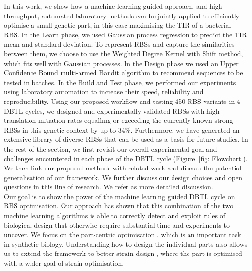 \documentclass{article}
\begin{document}
In this work, we show how a machine learning guided approach, and high-throughput, automated laboratory methods can be jointly applied to efficiently optimise a small genetic part, in this case maximising the TIR of a bacterial RBS.
In the Learn phase, we used Gaussian process regression to predict the TIR mean and standard deviation.
To represent RBSs and capture the similarities between them, we choose to use
the Weighted Degree Kernel with Shift method, which fits well with Gaussian processes.
In the Design phase we used an Upper Confidence Bound multi-armed Bandit algorithm to recommend sequences to be tested in batches.
In the Build and Test phase, we performed our experiments using laboratory
automation to increase their speed, reliability and reproducibility.
Using our proposed workflow and testing 450 RBS variants in 4 DBTL cycles,
we designed and experimentally-validated RBSs with high translation initiation rates equalling or exceeding the currently known strong RBSs in this genetic context by up to 34\%.
Furthermore, we have generated an extensive library of diverse RBSs that can be used as a basis for future studies.
In the rest of the section, we first revisit our overall experimental goal and challenges encountered in each phase of the
DBTL cycle (Figure~\ref{fig: Flowchart}).
We then link our proposed methods with related work and discuss the potential generalisation of our framework.
We further discuss our design choices and open questions in this line of research.
We refer \cite{zhang_synbio2021} as more detailed discussion.\\ 

Our goal is to show the power of the machine learning guided DBTL cycle on RBS optimisation.
Our approach has shown that this combination of the two machine learning algorithms is able to correctly detect and exploit rules of biological design that otherwise require substantial time and experiments to uncover.
We focus on the part-centric optimisation \cite{Hollerer2020}, which is an important task in synthetic biology. 
Understanding how to design the individual parts also allows us to extend the framework to better strain design \cite{Jervis2019}, where the part is optimised with a wider goal of strain optimisation.
\\
\end{document}
